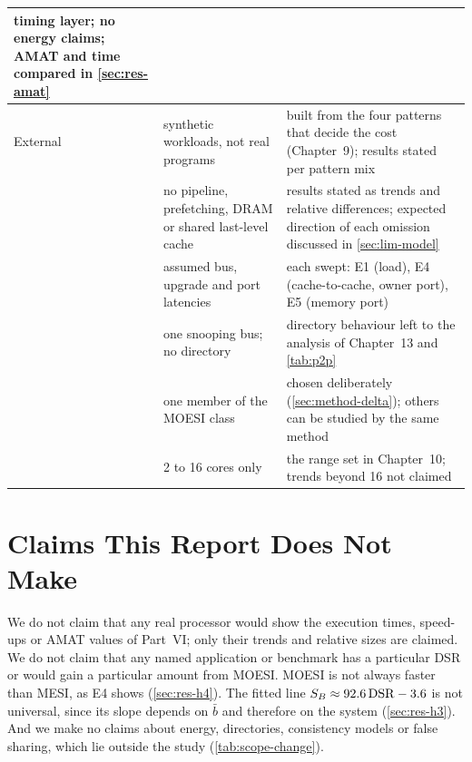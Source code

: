 \begin{table}[htbp]
\begin{tabular}{@{}L{1.5cm} L{4.6cm} L{6.6cm}@{}}
  timing layer; no energy claims; AMAT and time compared in \cref{sec:res-amat} \\
\midrule
External & synthetic workloads, not real programs & built from the four
  patterns that decide the cost (Chapter~9); results stated per pattern mix \\
 & no pipeline, prefetching, DRAM or shared last-level cache & results stated
  as trends and relative differences; expected direction of each omission
  discussed in \cref{sec:lim-model} \\
 & assumed bus, upgrade and port latencies & each swept: E1 (load), E4
  (cache-to-cache, owner port), E5 (memory port) \\
 & one snooping bus; no directory & directory behaviour left to the analysis
  of Chapter~13 and \cref{tab:p2p} \\
 & one member of the MOESI class & chosen deliberately (\cref{sec:method-delta});
  others can be studied by the same method \\
 & 2 to 16 cores only & the range set in Chapter~10; trends beyond 16 not
  claimed \\
\bottomrule
\end{tabular}
\end{table}

\section{Claims This Report Does Not Make}
\label{sec:lim-claims}
%

We do not claim that any real processor would show the execution times, speed-ups
or AMAT values of Part~VI; only their trends and relative sizes are claimed. We do
not claim that any named application or benchmark has a particular DSR or would
gain a particular amount from MOESI. MOESI is not always faster than MESI, as E4
shows (\cref{sec:res-h4}). The fitted line $S_B \approx 92.6\,\mathrm{DSR} - 3.6$ is not
universal, since its slope depends on $\bar b$ and therefore on the system
(\cref{sec:res-h3}). And we make no claims about energy, directories, consistency
models or false sharing, which lie outside the study (\cref{tab:scope-change}).

